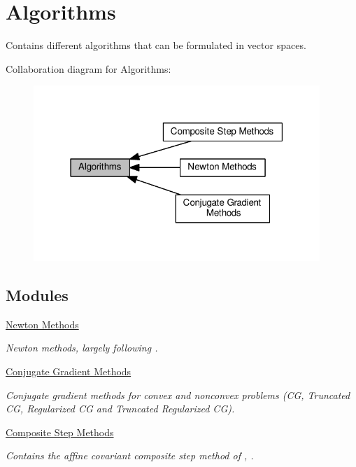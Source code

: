 \hypertarget{group__AlgorithmGroup}{}\section{Algorithms}
\label{group__AlgorithmGroup}


Contains different algorithms that can be formulated in vector spaces.  


Collaboration diagram for Algorithms\+:\nopagebreak
\begin{figure}[H]
\begin{center}
\leavevmode
\includegraphics[width=307pt]{group__AlgorithmGroup}
\end{center}
\end{figure}
\subsection*{Modules}
\begin{DoxyCompactItemize}
\item 
\hyperlink{group__NewtonGroup}{Newton Methods}
\begin{DoxyCompactList}\small\item\em Newton methods, largely following \cite{Deuflhard2004}. \end{DoxyCompactList}\item 
\hyperlink{group__CGGroup}{Conjugate Gradient Methods}
\begin{DoxyCompactList}\small\item\em Conjugate gradient methods for convex and nonconvex problems (C\+G, Truncated C\+G, Regularized C\+G and Truncated Regularized C\+G). \end{DoxyCompactList}\item 
\hyperlink{group__CSGroup}{Composite Step Methods}
\begin{DoxyCompactList}\small\item\em Contains the affine covariant composite step method of \cite{Lubkoll2015}, \cite{Lubkoll2015a}. \end{DoxyCompactList}\end{DoxyCompactItemize}


